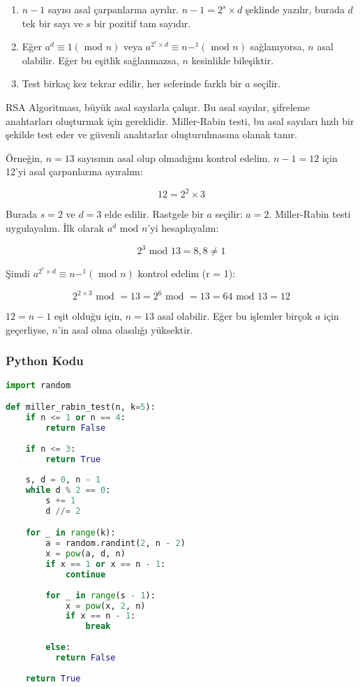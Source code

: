 \begin{enumerate}
    \item $n - 1$ sayısı asal çarpanlarına ayrılır. $n - 1 = 2^s \times d$ şeklinde yazılır, burada $d$ tek bir sayı ve $s$ bir pozitif tam sayıdır.
    \item Eğer $a^d \equiv 1 (\text{ mod } n)$ veya $a^{2^r \times d} \equiv n -^1 (\text{ mod } n)$ sağlanıyorsa, $n$ asal olabilir. Eğer bu eşitlik sağlanmazsa, $n$ kesinlikle bileşiktir.
    \item Test birkaç kez tekrar edilir, her seferinde farklı bir $a$ seçilir.
\end{enumerate}

RSA Algoritması, büyük asal sayılarla çalışır. Bu asal sayılar, şifreleme anahtarları oluşturmak için gereklidir. Miller-Rabin testi, bu asal sayıları hızlı bir şekilde test eder ve güvenli anahtarlar oluşturulmasına olanak tanır.

Örneğin, $n = 13$ sayısının asal olup olmadığını kontrol edelim. $n - 1 = 12$ için 12'yi asal çarpanlarına ayıralım:

\[ 12 = 2^2 \times 3 \]

Burada $s = 2$ ve $d = 3$ elde edilir. Rastgele bir $a$ seçilir: $a = 2$. Miller-Rabin testi uygulayalım. İlk olarak $a^d \text{ mod } n$'yi hesaplayalım:

\[ 2^3 \text{ mod } 13 = 8, 8 \neq 1 \]

Şimdi $a^{2^r \times d} \equiv n -^1 (\text{ mod } n)$ kontrol edelim (r = 1):

\[ 2^{2 \times 3} \text{ mod } = 13 = 2^6 \text{ mod } = 13 = 64 \text{ mod } 13 = 12 \]

$12 = n - 1$ eşit olduğu için, $n = 13$ asal olabilir. Eğer bu işlemler birçok $a$ için geçerliyse, $n$'in asal olma olasılığı yüksektir.

\subsubsection{Python Kodu}

\begin{lstlisting}[language=Python]
import random

def miller_rabin_test(n, k=5):
    if n <= 1 or n == 4:
        return False
    
    if n <= 3:
        return True
    
    s, d = 0, n - 1
    while d % 2 == 0:
        s += 1
        d //= 2

    for _ in range(k):
        a = random.randint(2, n - 2)
        x = pow(a, d, n)
        if x == 1 or x == n - 1:
            continue
        
        for _ in range(s - 1):
            x = pow(x, 2, n)
            if x == n - 1:
                break
        
        else:
          return False
            
    return True
\end{lstlisting}

